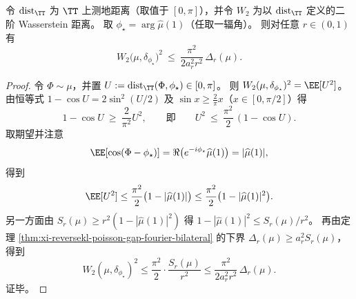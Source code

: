 \begin{proposition}\label{prop:xi-reversekl-gap-w2-to-delta}
令 \(\mathrm{dist}_{\TT}\) 为 \(\TT\) 上测地距离（取值于 \([0,\pi]\)），并令 \(W_2\) 为以 \(\mathrm{dist}_{\TT}\) 定义的二阶 Wasserstein 距离。
取 \(\phi_\star=\arg\widehat\mu(1)\)（任取一辐角）。
则对任意 \(r\in(0,1)\) 有
\begin{equation}\label{eq:xi-reversekl-gap-w2-to-delta}
\boxed{\;
W_2\bigl(\mu,\delta_{\phi_\star}\bigr)^2
\ \le\
\frac{\pi^2}{2a_r^{2}r^2}\,\Delta_r(\mu).\;}
\end{equation}
\end{proposition}
\begin{proof}
令 \(\Phi\sim\mu\)，并置 \(U:=\mathrm{dist}_{\TT}(\Phi,\phi_\star)\in[0,\pi]\)。
则 \(W_2(\mu,\delta_{\phi_\star})^2=\EE[U^2]\)。
由恒等式 \(1-\cos U=2\sin^2(U/2)\) 及 \(\sin x\ge \frac{2}{\pi}x\)（\(x\in[0,\pi/2]\)）得
\[
1-\cos U\ \ge\ \frac{2}{\pi^2}U^2,
\qquad\text{即}\qquad
U^2\ \le\ \frac{\pi^2}{2}\,(1-\cos U).
\]
取期望并注意
\[
\EE[\cos(\Phi-\phi_\star)]
=\Re\!\left(e^{-i\phi_\star}\widehat\mu(1)\right)
=|\widehat\mu(1)|,
\]
得到
\[
\EE[U^2]\le \frac{\pi^2}{2}\bigl(1-|\widehat\mu(1)|\bigr)
\le \frac{\pi^2}{2}\bigl(1-|\widehat\mu(1)|^2\bigr).
\]
另一方面由 \(S_r(\mu)\ge r^2(1-|\widehat\mu(1)|^2)\) 得
\(
1-|\widehat\mu(1)|^2\le S_r(\mu)/r^2
\)。
再由定理 \ref{thm:xi-reversekl-poisson-gap-fourier-bilateral} 的下界 \(\Delta_r(\mu)\ge a_r^2S_r(\mu)\)，得到
\[
W_2(\mu,\delta_{\phi_\star})^2
\le \frac{\pi^2}{2}\cdot \frac{S_r(\mu)}{r^2}
\le \frac{\pi^2}{2a_r^2r^2}\,\Delta_r(\mu).
\]
证毕。
\end{proof}

